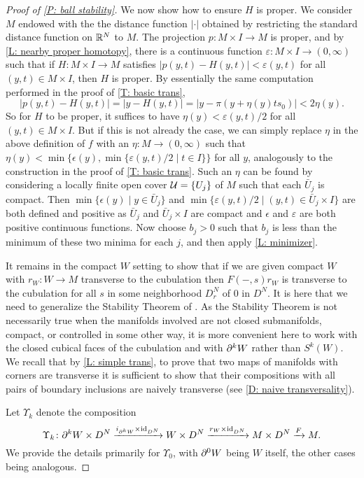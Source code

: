 \begin{proof}[Proof of \cref{P: ball stability}]
	We now show how to ensure $H$ is proper.
	We consider $M$ endowed with the the distance function $|\cdot|$ obtained by restricting the standard distance function on $\mathbb{R}^N$ to $M$.
	The projection $p \colon M \times I \to M$ is proper, and by
	\cref{L: nearby proper homotopy}, there is a continuous function $\varepsilon \colon M \times I \to (0,\infty)$ such that if $H \colon M \times I \to M$ satisfies $|p(y,t)-H(y,t)| < \varepsilon(y,t)$ for all $(y,t) \in M \times I$, then $H$ is proper.
	By essentially the same computation performed in the proof of \cref{T: basic trans},
	$$|p(y,t)-H(y,t)| = |y-H(y,t)| = |y - \pi(y + \eta(y) ts_0)| < 2 \eta(y).$$
	So for $H$ to be proper, it suffices to have $\eta(y) < \varepsilon(y,t)/2$ for all $(y,t) \in M \times I$.
	But if this is not already the case, we can simply replace $\eta$ in the above definition of $f$ with an $\eta \colon M \to (0,\infty)$ such that $\eta(y) < \min\{\epsilon(y), \min\{\varepsilon(y,t)/2 \mid t \in I\}\}$ for all $y$, analogously to the construction in the proof of \cref{T: basic trans}.
	Such an $\eta$ can be found by considering a locally finite open cover $\mathcal{U} = \{U_j\}$ of $M$ such that each $\bar U_j$ is compact.
	Then $\min\{\epsilon(y) \mid y \in \bar U_j\}$ and $\min\{\varepsilon(y,t)/2 \mid (y,t) \in \bar U_j \times I\}$ are both defined and positive as $\bar U_j$ and $\bar U_j \times I$ are compact and $\epsilon$ and $\varepsilon$ are both positive continuous functions.
	Now choose $b_j > 0$ such that $b_j$ is less than the minimum of these two minima for each $j$, and then apply \cref{L: minimizer}.

	It remains in the compact $W$ setting to show that if we are given compact $W$ with $r_W \colon W \to M$ transverse to the cubulation then $F(-,s)r_W$ is transverse to the cubulation for all $s$ in some neighborhood $D_r^N$ of $0$ in $D^N$.
	It is here that we need to generalize the Stability Theorem of \cite[Section 1.6]{GuPo74}.
	As the Stability Theorem is not necessarily true when the manifolds involved are not closed submanifolds, compact, or controlled in some other way, it is more convenient here to work with the closed cubical faces of the cubulation and with $\partial^kW$ rather than $S^k(W)$.
	We recall that by \cref{L: simple trans}, to prove that two maps of manifolds with corners are transverse it is sufficient to show that their compositions with all pairs of boundary inclusions are naively transverse (see \cref{D: naive transversality}).

	Let $\Upsilon_k$ denote the composition $$\Upsilon_k \colon \partial^kW \times D^N \xrightarrow{i_{\partial^ kW} \times \mathrm{id}_{D^N}} W \times D^N \xrightarrow{r_W \times \mathrm{id}_{D^N} } M \times D^N \xrightarrow{F} M.$$
	We provide the details primarily for $\Upsilon_0$, with $\partial^0 W$ being $W$ itself, the other cases being analogous.



\end{proof}
